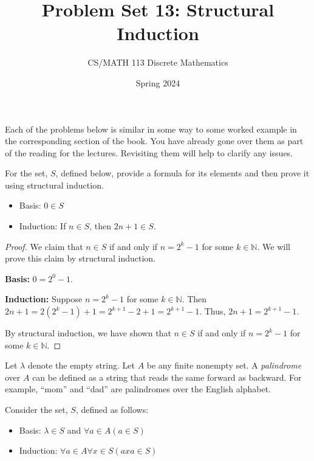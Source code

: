 \documentclass[a4paper]{exam}
\title{Problem Set 13: Structural Induction}
\author{CS/MATH 113 Discrete Mathematics}
\date{Spring 2024}
\begin{document}
\maketitle

Each of the problems below is similar in some way to some worked example in the corresponding section of the book. You have already gone over them as part of the reading for the lectures. Revisiting them will help to clarify any issues.

\begin{questions}

\question For the set, $S$, defined below, provide a formula for its elements and then prove it using structural induction.
  \begin{itemize}
  \item Basis: $0 \in S$
  \item Induction: If $n \in S$, then $2n+1 \in S$.
  \end{itemize}

  \begin{solution}
    \begin{proof}
      We claim that $n \in S$ if and only if $n = 2^k - 1$ for some $k \in \mathbb{N}$. We will prove this claim by structural induction.

      \textbf{Basis:} $0 = 2^0 - 1$.

      \textbf{Induction:} Suppose $n = 2^k - 1$ for some $k \in \mathbb{N}$. Then $2n + 1 = 2(2^k - 1) + 1 = 2^{k+1} - 2 + 1 = 2^{k+1} - 1$. Thus, $2n + 1 = 2^{k+1} - 1$.

      By structural induction, we have shown that $n \in S$ if and only if $n = 2^k - 1$ for some $k \in \mathbb{N}$.
    \end{proof}
  \end{solution}
  
\question Let $\lambda$ denote the empty string. Let $A$ be any finite nonempty set. A \textit{palindrome} over $A$ can be defined as a string that reads the same forward as backward. For example, ``mom'' and ``dad'' are palindromes over the English alphabet.

  Consider the set, $S$, defined as follows:
  \begin{itemize}
  \item Basis: $\lambda \in S$ and $\forall a \in A (a \in S)$
  \item Induction: $\forall a \in A\forall x \in S (axa \in S)$
  \end{itemize}


\end{questions}
\end{document}
